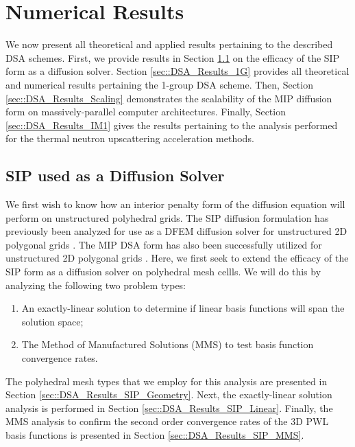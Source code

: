 \section{Numerical Results}
\label{sec::DSA_Results}

We now present all theoretical and applied results pertaining to the described DSA schemes. First, we provide results in Section \ref{sec::DSA_Results_SIP} on the efficacy of the SIP form as a diffusion solver. Section \ref{sec::DSA_Results_1G} provides all theoretical and numerical results pertaining the 1-group DSA scheme. Then, Section \ref{sec::DSA_Results_Scaling} demonstrates the scalability of the MIP diffusion form on massively-parallel computer architectures. Finally, Section \ref{sec::DSA_Results_IM1} gives the results pertaining to the analysis performed for the thermal neutron upscattering acceleration methods.

\subsection{SIP used as a Diffusion Solver}
\label{sec::DSA_Results_SIP}

We first wish to know how an interior penalty form of the diffusion equation will perform on unstructured polyhedral grids. The SIP diffusion formulation has previously been analyzed for use as a DFEM diffusion solver for unstructured 2D polygonal grids \cite{ragusa2015discontinuous}. The MIP DSA form has also been successfully utilized for unstructured 2D polygonal grids \cite{turcksin2014discontinuous}. Here, we first seek to extend the efficacy of the SIP form as a diffusion solver on polyhedral mesh cellls. We will do this by analyzing the following two problem types:

\begin{enumerate}
	\item An exactly-linear solution to determine if linear basis functions will span the solution space;
	\item The Method of Manufactured Solutions (MMS) to test basis function convergence rates.
\end{enumerate}

The polyhedral mesh types that we employ for this analysis are presented in Section \ref{sec::DSA_Results_SIP_Geometry}. Next, the exactly-linear solution analysis is performed in Section \ref{sec::DSA_Results_SIP_Linear}. Finally, the MMS analysis to confirm the second order convergence rates of the 3D PWL basis functions is presented in Section \ref{sec::DSA_Results_SIP_MMS}.

